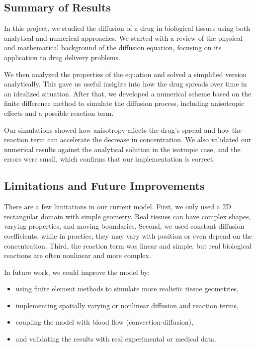 \documentclass[11pt, a4paper]{article}
\begin{document}
\subsection{Summary of Results}
In this project, we studied the diffusion of a drug in biological tissues using both analytical and numerical approaches.
We started with a review of the physical and mathematical background of the diffusion equation, focusing on its application to drug delivery problems.

We then analyzed the properties of the equation and solved a simplified version analytically.
This gave us useful insights into how the drug spreads over time in an idealized situation.
After that, we developed a numerical scheme based on the finite difference method to simulate the diffusion process, including anisotropic effects and a possible reaction term.

Our simulations showed how anisotropy affects the drug’s spread and how the reaction term can accelerate the decrease in concentration.
We also validated our numerical results against the analytical solution in the isotropic case, and the errors were small, which confirms that our implementation is correct.

\subsection{Limitations and Future Improvements}
There are a few limitations in our current model. First, we only used a 2D rectangular domain with simple geometry.
Real tissues can have complex shapes, varying properties, and moving boundaries.
Second, we used constant diffusion coefficients, while in practice, they may vary with position or even depend on the concentration.
Third, the reaction term was linear and simple, but real biological reactions are often nonlinear and more complex.

In future work, we could improve the model by:
\begin{itemize}
    \item using finite element methods to simulate more realistic tissue geometries,
    \item implementing spatially varying or nonlinear diffusion and reaction terms,
    \item coupling the model with blood flow (convection-diffusion),
    \item and validating the results with real experimental or medical data.
\end{itemize}
\end{document}
